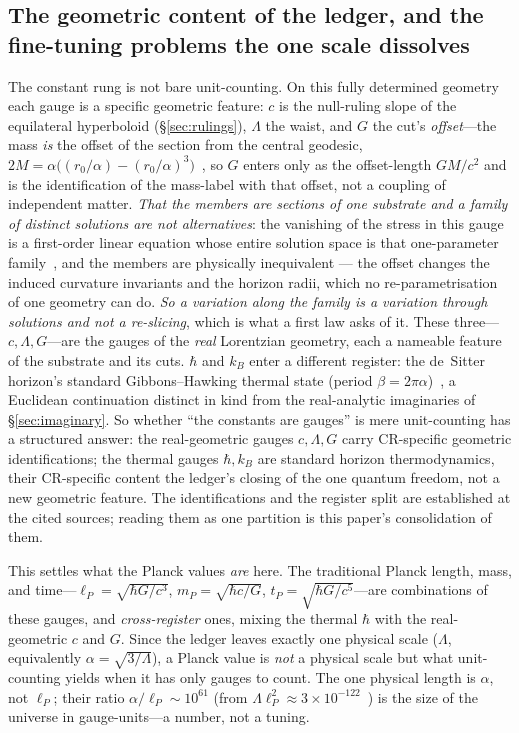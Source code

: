 \documentclass[11pt,a4paper]{article}
\theoremstyle{definition}
\begin{document}
\subsection{The geometric content of the ledger, and the fine-tuning problems the one scale dissolves}\label{sec:ledger}

The constant rung is not bare unit-counting. On this fully determined geometry each gauge is a specific geometric feature: $c$ is the null-ruling slope of the equilateral hyperboloid (\S\ref{sec:rulings}), $\Lambda$ the waist, and $G$ the cut's \emph{offset}---the mass \emph{is} the offset of the section from the central geodesic, $2M=\alpha\bigl((r_0/\alpha)-(r_0/\alpha)^3\bigr)$~\cite{JanzenOperator,JanzenSlicing}, so $G$ enters only as the offset-length $GM/c^2$ and is the identification of the mass-label with that offset, not a coupling of independent matter. \emph{That the members are sections of one substrate and a family of distinct solutions are not alternatives}: the vanishing of the stress in this gauge is a first-order linear equation whose entire solution space is that one-parameter family~\cite{JanzenOperator}, and the members are physically inequivalent --- the offset changes the induced curvature invariants and the horizon radii, which no re-parametrisation of one geometry can do. \emph{So a variation along the family is a variation through solutions and not a re-slicing}, which is what a first law asks of it. These three---$c,\Lambda,G$---are the gauges of the \emph{real} Lorentzian geometry, each a nameable feature of the substrate and its cuts. $\hbar$ and $k_B$ enter a different register: the de~Sitter horizon's standard Gibbons--Hawking thermal state (period $\beta=2\pi\alpha$)~\cite{JanzenCanonicalTime}, a Euclidean continuation distinct in kind from the real-analytic imaginaries of \S\ref{sec:imaginary}. So whether ``the constants are gauges'' is mere unit-counting has a structured answer: the real-geometric gauges $c,\Lambda,G$ carry CR-specific geometric identifications; the thermal gauges $\hbar,k_B$ are standard horizon thermodynamics, their CR-specific content the ledger's closing of the one quantum freedom, not a new geometric feature. The identifications and the register split are established at the cited sources; reading them as one
partition is this paper's consolidation of them.

This settles what the Planck values \emph{are} here. The traditional Planck length, mass, and time---$\ell_P=\sqrt{\hbar G/c^3}$, $m_P=\sqrt{\hbar c/G}$, $t_P=\sqrt{\hbar G/c^5}$---are combinations of these gauges, and \emph{cross-register} ones, mixing the thermal $\hbar$ with the real-geometric $c$ and $G$. Since the ledger leaves exactly one physical scale ($\Lambda$, equivalently $\alpha=\sqrt{3/\Lambda}$), a Planck value is \emph{not} a physical scale but what unit-counting yields when it has only gauges to count. The one physical length is $\alpha$, not $\ell_P$; their ratio $\alpha/\ell_P\sim10^{61}$ (from $\Lambda\ell_P^2\approx3\times10^{-122}$~\cite{JanzenCRcosmology}) is the size of the universe in gauge-units---a number, not a tuning.
\end{document}
